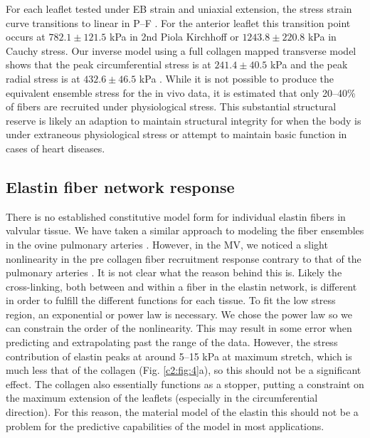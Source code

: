     For each leaflet tested under EB strain and uniaxial extension, the stress strain curve transitions to linear in P–F \cite{sasaki_elongation_1996}\cite{sasaki_stress_1996}\cite{liao_relation_2007}. For the anterior leaflet this transition point occurs at $782.1\pm121.5$ kPa in 2nd Piola Kirchhoff or $1243.8\pm220.8$ kPa in Cauchy stress. Our inverse model using a full collagen mapped transverse model shows that the peak circumferential stress is at $241.4\pm40.5$ kPa and the peak radial stress is at $432.6\pm46.5$ kPa \cite{lee_inverse_2014}. While it is not possible to produce the equivalent ensemble stress for the in vivo data, it is estimated that only 20–40\% of fibers are recruited under physiological stress. This substantial structural reserve is likely an adaption to maintain structural integrity for when the body is under extraneous physiological stress or attempt to maintain basic function in cases of heart diseases.
    



\subsection{Elastin fiber network response}

    There is no established constitutive model form for individual elastin fibers in valvular tissue. We have taken a similar approach to modeling the fiber ensembles in the ovine pulmonary arteries \cite{fata_insights_2014}. However, in the MV, we noticed a slight nonlinearity in the pre collagen fiber recruitment response contrary to that of the pulmonary arteries \cite{fata_insights_2014}. It is not clear what the reason behind this is. Likely the cross-linking, both between and within a fiber in the elastin network, is different in order to fulfill the different functions for each tissue. To fit the low stress region, an exponential or power law is necessary. We chose the power law so we can constrain the order of the nonlinearity. This may result in some error when predicting and extrapolating past the range of the data. However, the stress contribution of elastin peaks at around 5–15 kPa at maximum stretch, which is much less that of the collagen (Fig. \ref{c2:fig:4}a), so this should not be a significant effect. The collagen also essentially functions as a stopper, putting a constraint on the maximum extension of the leaflets (especially in the circumferential direction). For this reason, the material model of the elastin this should not be a problem for the predictive capabilities of the model in most applications.


